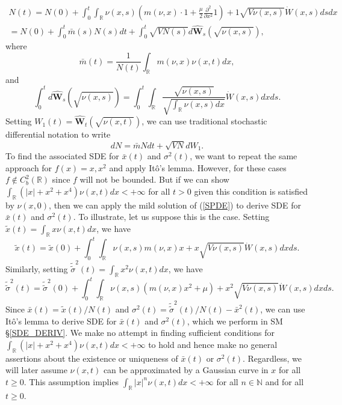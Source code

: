 \documentclass[]{article}
\begin{document}
\begin{multline}
N(t)=N(0)+\int_0^t\int_\mathbb{R}\nu(x,s)\left(m(\nu,x)\cdot1+\frac{\mu}{2}\frac{\partial^2}{\partial x^2}1\right)+1\sqrt{V\nu(x,s)}\dot W(x,s)dsdx \\
=N(0)+\int_0^t\bar m(s)N(s)dt+\int_0^t\sqrt{VN(s)}d\hat{\mathbf{W}}_s(\sqrt{\nu(x,s)}),
\end{multline} where \begin{equation}
\bar m(t)=\frac{1}{N(t)}\int_\mathbb{R}m(\nu,x)\nu(x,t)dx,
\end{equation} and \begin{equation}
\int_0^td\hat{\mathbf{W}}_s(\sqrt{\nu(x,s)})=\int_0^t\int_\mathbb{R}\frac{\sqrt{\nu(x,s)}}{\sqrt{\int_\mathbb{R}\nu(x,s)dx}}\dot W(x,s)dxds.
\end{equation} Setting \(W_1(t)=\hat{\mathbf{W}}_t(\sqrt{\nu(x,t)})\),
we can use traditional stochastic differential notation to write
\begin{equation}
dN=\bar mNdt+\sqrt{VN}dW_1.
\end{equation} To find the associated SDE for \(\bar x(t)\) and
\(\sigma^2(t)\), we want to repeat the same approach for \(f(x)=x,x^2\)
and apply Itô's lemma. However, for these cases
\(f\notin C^2_b(\mathbb{R})\) since \(f\) will not be bounded. But if we
can show \(\int_\mathbb{R}(|x|+x^2+x^4)\nu(x,t)dx<+\infty\) for all
\(t>0\) given this condition is satisfied by \(\nu(x,0)\), then we can
apply the mild solution of (\ref{SPDE}) to derive SDE for \(\bar x(t)\)
and \(\sigma^2(t)\). To illustrate, let us suppose this is the case.
Setting \(\tilde x(t)=\int_\mathbb{R}x\nu(x,t)dx\), we have
\begin{equation}
\tilde x(t)=\tilde x(0)+\int_0^t\int_\mathbb{R}\nu(x,s)m(\nu,x)x+x\sqrt{V\nu(x,s)}\dot W(x,s)dxds.
\end{equation} Similarly, setting
\(\tilde{\tilde\sigma}^2(t)=\int_\mathbb{R}x^2\nu(x,t)dx\), we have
\begin{equation}
\tilde{\tilde\sigma}^2(t)=\tilde{\tilde\sigma}^2(0)+\int_0^t\int_\mathbb{R}\nu(x,s)\left(m(\nu,x)x^2+\mu\right)+x^2\sqrt{V\nu(x,s)}\dot W(x,s)dxds.
\end{equation} Since \(\bar x(t)=\tilde x(t)/N(t)\) and
\(\sigma^2(t)=\tilde{\tilde\sigma}^2(t)/N(t)-\bar x^2(t)\), we can use
Itô's lemma to derive SDE for \(\bar x(t)\) and \(\sigma^2(t)\), which
we perform in SM \S\ref{SDE_DERIV}. We make no attempt in finding
sufficient conditions for
\(\int_\mathbb{R}(|x|+x^2+x^4)\nu(x,t)dx<+\infty\) to hold and hence
make no general assertions about the existence or uniqueness of
\(\bar x(t)\) or \(\sigma^2(t)\). Regardless, we will later assume
\(\nu(x,t)\) can be approximated by a Gaussian curve in \(x\) for all
\(t\geq0\). This assumption implies
\(\int_\mathbb{R}|x|^n\nu(x,t)dx<+\infty\) for all \(n\in\mathbb{N}\)
and for all \(t\geq0\).
\end{document}
